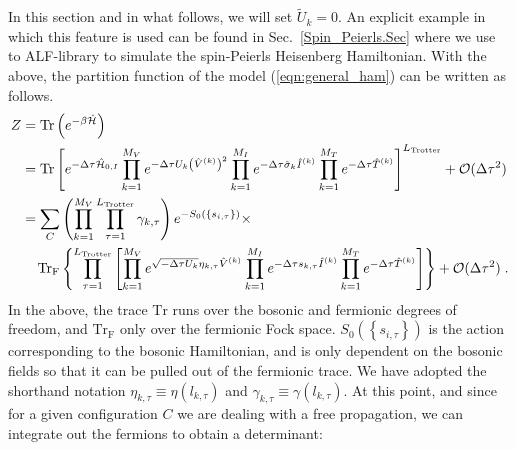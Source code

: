 In this  section and in  what  follows,  we  will  set  $\tilde{U}_k =0$.  An  explicit  example in which  this  feature  is  used  can  be  found in 
Sec.~\ref{Spin_Peierls.Sec}   where   we  use  to  ALF-library  to  simulate  the    spin-Peierls  Heisenberg  Hamiltonian.  
With the above, the partition function of the model (\ref{eqn:general_ham}) can be written as follows.
\begin{align}\label{eqn:partition_1}
Z &= \mathop{\mathrm{Tr}}{\left(e^{-\beta \hat{\mathcal{H}} }\right)}\nonumber\\
  &=   \mathop{\mathrm{Tr}}{  \left[ e^{-\Delta \tau \hat{\mathcal{H}}_{0,I}}  
    \prod_{k=1}^{M_V}   e^{ - \Delta \tau  U_k \left(  \hat{V}^{(k)} \right)^2}   \prod_{k=1}^{M_I}   e^{  -\Delta \tau  \hat{\sigma}_{k}  \hat{I}^{(k)}} 
     \prod_{k=1}^{M_T}   e^{-\Delta \tau \hat{T}^{(k)}}  
   \right]^{L_{\text{Trotter}}}}  + \mathcal{O}(\Delta\tau^{2})\nonumber \\
   &=
   \sum_{C} \left( \prod_{k=1}^{M_V} \prod_{\tau=1}^{L_{\mathrm{Trotter}}} \gamma_{k,\tau} \right) e^{-S_0 \left( \left\{ s_{i,\tau} \right\}  \right) }\times \nonumber\\
   &\quad
    \mathop{\mathrm{Tr}_{\mathrm{F}}}{ \left\{  \prod_{\tau=1}^{L_{\mathrm{Trotter}}} \left[  
    \prod_{k=1}^{M_V}   e^{  \sqrt{ -\Delta \tau  U_k} \eta_{k,\tau} \hat{V}^{(k)} }   \prod_{k=1}^{M_I}   e^{  -\Delta \tau s_{k,\tau}  \hat{I}^{(k)}}  
      \prod_{k=1}^{M_T}   e^{-\Delta \tau \hat{T}^{(k)}}    \right]\right\} }+ \mathcal{O}(\Delta\tau^{2})\;.
\end{align}
In the above,  the trace $\mathrm{Tr} $  runs over the bosonic   and  fermionic degrees of freedom, and $ \mathrm{Tr}_{\mathrm{F}}  $ only over the  fermionic Fock space. 
$S_0 \left( \left\{ s_{i,\tau} \right\}  \right)  $ is the action  corresponding to the bosonic Hamiltonian, and is only dependent on the bosonic fields so that  it can be pulled out of the fermionic trace.  We have adopted the shorthand notation $\eta_{k,\tau} \equiv \eta(l_{k,\tau})$   and $\gamma_{k,\tau} \equiv \gamma(l_{k,\tau})$.
At this point,  and  since for a given configuration $C$  we are dealing with a free propagation, we can integrate out the fermions to obtain a determinant: 

